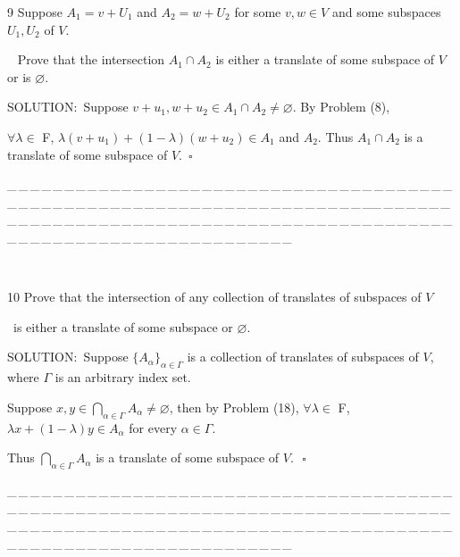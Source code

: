 \documentclass[a4paper, 11pt, UTF8]{article}
\begin{document}
\begin{large}
{\timesbf\Large 9} {\timessl\Large 
Suppose $A_1=v+U_1$ and $A_2=w+U_2$ for some $v,w\in V$ and some subspaces $U_1,U_2$ of $V$.}\par\,\,\,
{\timessl\Large Prove that the intersection $A_1\cap A_2$ is either a translate of some subspace of $V$ or is $\varnothing$.
}\par
{\timesbf S\footnotesize{OLUTION:}}\,\,\,Suppose $v+u_1,w+u_2\in A_1\cap A_2\neq\varnothing$. By Problem (8),\par\quad
$\forall\lambda\in$ {\timesbf F}, $\lambda(v+u_1)+(1-\lambda)(w+u_2)\in A_1$ and $A_2$. Thus $A_1\cap A_2$ is a translate of some subspace of $V$.\,\,\,$\square$\par
{\tiny \_\,\_\,\_\,\_\,\_\,\_\,\_\,\_\,\_\,\_\,\_\,\_\,\_\,\_\,\_\,\_\,\_\,\_\,\_\,\_\,\_\,\_\,\_\,\_\,\_\,\_\,\_\,\_\,\_\,\_\,\_\,\_\,\_\,\_\,\_\,\_\,\_\,\_\,\_\,\_\,\_\,\_\,\_\,\_\,\_\,\_\,\_\,\_\,\_\,\_\,\_\,\_\,\_\,\_\,\_\,\_\,\_\,\_\,\_\,\_\,\_\,\_\,\_\,\_\,\_\,\_\,\_\,\_\,\_\,\_\,\_\_\,\_\,\_\,\_\,\_\,\_\,\_\,\_\,\_\,\_\,\_\,\_\,\_\,\_\,\_\,\_\,\_\,\_\,\_\,\_\,\_\,\_\,\_\,\_\,\_\,\_\,\_\,\_\,\_\,\_\,\_\,\_\,\_\,\_\,\_\,\_\,\_\,\_\,\_\,\_\,\_\,\_\,\_\,\_\,\_\,\_\,\_\,\_\,\_\,\_\,\_\,\_\,\_\,\_\,\_\,\_\,\_\,\_\,\_\,\_\,\_\,\_\,\_\,\_\,\_\,\_\,\_\,\_\,\_\,\_\,\_}{\tiny\,\par}

{\timesbf\Large 10} {\timessl\Large 
Prove that the intersection of any collection of translates of subspaces of $V$}\par\quad\,
{\timessl\Large is either a translate of some subspace or $\varnothing$.}\par
{\timesbf S\footnotesize{OLUTION:}}\,\,\,Suppose $\{A_{\alpha}\}_{\alpha\in\Gamma}$ is a collection of translates of subspaces of $V$, where $\Gamma$ is an arbitrary index set.\par\quad
Suppose $x,y\in\bigcap_{\alpha\in\Gamma}A_{\alpha}\neq\varnothing$, then by Problem (18), $\forall\lambda\in$ {\timesbf F}, $\lambda x+(1-\lambda)y\in A_{\alpha}$ for every $\alpha\in\Gamma$.\par\quad
Thus $\bigcap_{\alpha\in\Gamma}A_\alpha$ is a translate of some subspace of $V$.\,\,\,\,$\square$\par
{\tiny \_\,\_\,\_\,\_\,\_\,\_\,\_\,\_\,\_\,\_\,\_\,\_\,\_\,\_\,\_\,\_\,\_\,\_\,\_\,\_\,\_\,\_\,\_\,\_\,\_\,\_\,\_\,\_\,\_\,\_\,\_\,\_\,\_\,\_\,\_\,\_\,\_\,\_\,\_\,\_\,\_\,\_\,\_\,\_\,\_\,\_\,\_\,\_\,\_\,\_\,\_\,\_\,\_\,\_\,\_\,\_\,\_\,\_\,\_\,\_\,\_\,\_\,\_\,\_\,\_\,\_\,\_\,\_\,\_\,\_\,\_\_\,\_\,\_\,\_\,\_\,\_\,\_\,\_\,\_\,\_\,\_\,\_\,\_\,\_\,\_\,\_\,\_\,\_\,\_\,\_\,\_\,\_\,\_\,\_\,\_\,\_\,\_\,\_\,\_\,\_\,\_\,\_\,\_\,\_\,\_\,\_\,\_\,\_\,\_\,\_\,\_\,\_\,\_\,\_\,\_\,\_\,\_\,\_\,\_\,\_\,\_\,\_\,\_\,\_\,\_\,\_\,\_\,\_\,\_\,\_\,\_\,\_\,\_\,\_\,\_\,\_\,\_\,\_\,\_\,\_\,\_}\par


\end{large}
\end{document}
